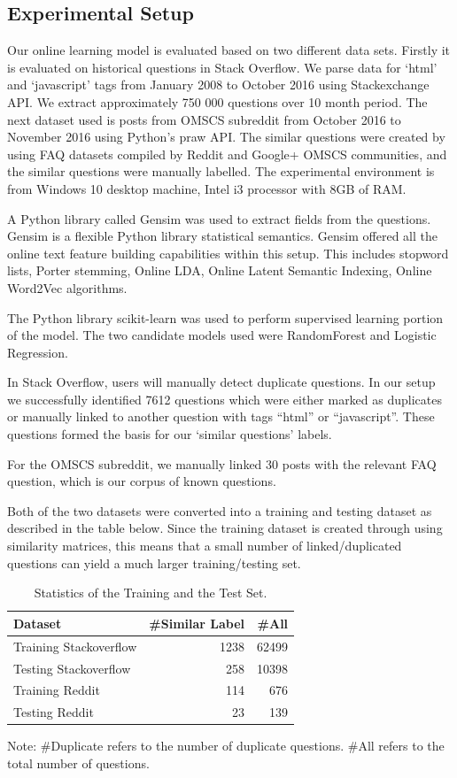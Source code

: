 \documentclass[journal,12pt,onecolumn,draftclsnofoot,]{IEEEtran}
\begin{document}
\subsection{Experimental Setup}

Our online learning model is evaluated based on two different data sets. Firstly it is evaluated on historical questions in Stack Overflow. We parse data for `html' and `javascript' tags from January 2008 to October 2016 using Stackexchange API. We extract approximately 750 000 questions over 10 month period. The next dataset used is posts from OMSCS subreddit from October 2016 to November 2016 using Python's praw API. The similar questions were created by using FAQ datasets compiled by Reddit and Google+ OMSCS communities, and the similar questions were manually labelled. The experimental environment is from Windows 10 desktop machine, Intel i3 processor with 8GB of RAM. 

A Python library called Gensim was used to extract fields from the questions. Gensim is a flexible Python library statistical semantics. Gensim offered all the online text feature building capabilities within this setup. This includes stopword lists, Porter stemming, Online LDA, Online Latent Semantic Indexing, Online Word2Vec algorithms.

The Python library scikit-learn was used to perform supervised learning portion of the model. The two candidate models used were RandomForest and Logistic Regression. 

In Stack Overflow, users will manually detect duplicate questions. In our setup we successfully identified 7612 questions which were either marked as duplicates or manually linked to another question with tags ``html'' or ``javascript''. These questions formed the basis for our `similar questions' labels. 

For the OMSCS subreddit, we manually linked 30 posts with the relevant FAQ question, which is our corpus of known questions. 

Both of the two datasets were converted into a training and testing dataset as described in the table below. Since the training dataset is created through using similarity matrices, this means that a small number of linked/duplicated questions can yield a much larger training/testing set. 

\begin{table}[!t]
\centering
\caption{Statistics of the Training and the Test Set.}
 \begin{tabular}{l r r } 
 \hline
 Dataset & \#Similar Label & \#All \\ 
 \hline
 Training Stackoverflow & 1238 & 62499 \\ 
 Testing Stackoverflow & 258 & 10398  \\
 Training Reddit & 114 &   676 \\
 Testing Reddit & 23 & 139  \\
 \hline
\end{tabular}

\hfill \break

Note: \#Duplicate refers to the number of duplicate questions. \#All refers to the total number of questions.
\end{table}
\end{document}

